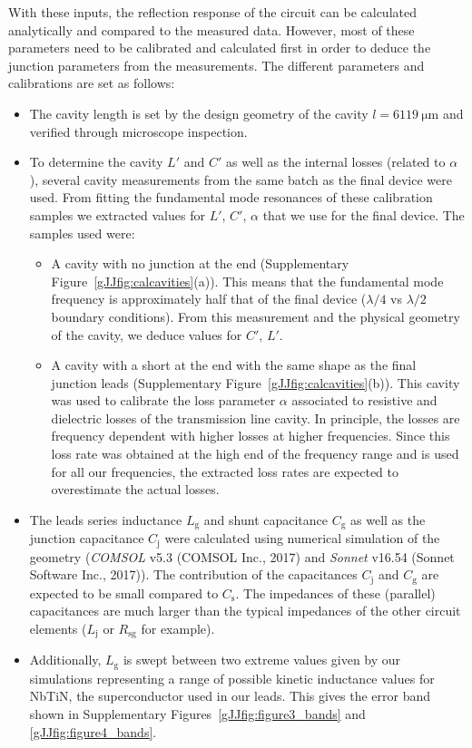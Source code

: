 With these inputs, the reflection response of the circuit can be calculated analytically and compared to the measured data.
However, most of these parameters need to be calibrated and calculated first in order to deduce the junction parameters from the measurements.
The different parameters and calibrations are set as follows:
\begin{itemize}
	\item The cavity length is set by the design geometry of the cavity $l=\SI{6119}{\micro\meter}$ and verified through microscope inspection.
	\item To determine the cavity $L'$ and $C'$ as well as the internal losses (related to $\alpha$), several cavity measurements from the same batch as the final device were used.
	From fitting the fundamental mode resonances of these calibration samples we extracted values for $L'$, $C'$, $\alpha$ that we use for the final device.
	The samples used were:
	\begin{itemize}
		\item A cavity with no junction at the end (Supplementary Figure~\ref{gJJfig:calcavities}(a)).
		This means that the fundamental mode frequency is approximately half that of the final device ($\lambda/4$ vs $\lambda/2$ boundary conditions).
		From this measurement and the physical geometry of the cavity, we deduce values for $C'$, $L'$.
		\item A cavity with a short at the end with the same shape as the final junction leads (Supplementary Figure~\ref{gJJfig:calcavities}(b)).
		This cavity was used to calibrate the loss parameter $\alpha$ associated to resistive and dielectric losses of the transmission line cavity.
		In principle, the losses are frequency dependent with higher losses at higher frequencies.
		Since this loss rate was obtained at the high end of the frequency range and is used for all our frequencies, the extracted loss rates are expected to overestimate the actual losses.
	\end{itemize}
	\item The leads series inductance $L_\text{g}$ and shunt capacitance $C_\text{g}$ as well as the junction capacitance $C_\text{j}$ were calculated using numerical simulation of the geometry (\textit{COMSOL} v5.3 (COMSOL Inc., 2017) and \textit{Sonnet} v16.54 (Sonnet Software Inc., 2017)).
	The contribution of the capacitances $C_\text{j}$ and $C_\text{g}$ are expected to be small compared to $C_\text{s}$.
	The impedances of these (parallel) capacitances are much larger than the typical impedances of the other circuit elements ($L_\text{j}$ or $R_\text{sg}$ for example).
	\item Additionally, $L_\text{g}$ is swept between two extreme values given by our simulations representing a range of possible kinetic inductance values for NbTiN, the superconductor used in our leads.
	This gives the error band shown in Supplementary Figures~\ref{gJJfig:figure3_bands} and \ref{gJJfig:figure4_bands}.
\end{itemize}






